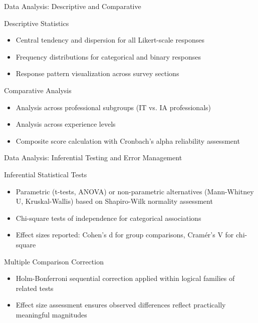 \documentclass{beamer}
\begin{document}
\begin{frame}[allowframebreaks]{Data Analysis: Descriptive and Comparative}
  \begin{block}{Descriptive Statistics}
    \begin{itemize}
      \item Central tendency and dispersion for all Likert-scale responses
      \item Frequency distributions for categorical and binary responses
      \item Response pattern visualization across survey sections
    \end{itemize}
  \end{block}

  \begin{block}{Comparative Analysis}
    \begin{itemize}
      \item Analysis across professional subgroups (IT vs. IA professionals)
      \item Analysis across experience levels
      \item Composite score calculation with Cronbach's alpha reliability assessment
    \end{itemize}
  \end{block}
\end{frame}

\begin{frame}[allowframebreaks]{Data Analysis: Inferential Testing and Error Management}
  \begin{block}{Inferential Statistical Tests}
    \begin{itemize}
      \item Parametric (t-tests, ANOVA) or non-parametric alternatives (Mann-Whitney U, Kruskal-Wallis) based on Shapiro-Wilk normality assessment
      \item Chi-square tests of independence for categorical associations
      \item Effect sizes reported: Cohen's d for group comparisons, Cram\'{e}r's V for chi-square
    \end{itemize}
  \end{block}

  \begin{block}{Multiple Comparison Correction}
    \begin{itemize}
      \item Holm-Bonferroni sequential correction applied within logical families of related tests
      \item Effect size assessment ensures observed differences reflect practically meaningful magnitudes
    \end{itemize}
  \end{block}
\end{frame}
\end{document}

